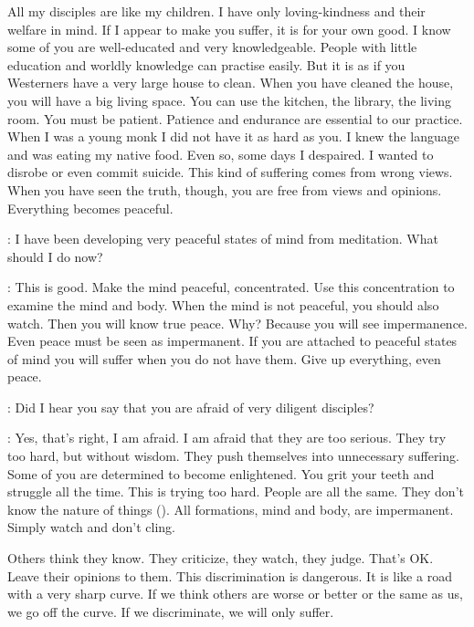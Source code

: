 All my disciples are like my children. I have only loving-kindness and their welfare in mind. If I appear to make you suffer, it is for your own good. I know some of you are well-educated and very knowledgeable. People with little education and worldly knowledge can practise easily. But it is as if you Westerners have a very large house to clean. When you have cleaned the house, you will have a big living space. You can use the kitchen, the library, the living room. You must be patient. Patience and endurance are essential to our practice. When I was a young monk I did not have it as hard as you. I knew the language and was eating my native food. Even so, some days I despaired. I wanted to disrobe or even commit suicide. This kind of suffering comes from wrong views. When you have seen the truth, though, you are free from views and opinions. Everything becomes peaceful. 

:
I have been developing very peaceful states of mind from meditation. What should I do now? 

: This is good. Make the mind peaceful, concentrated. Use this concentration to examine the mind and body. When the mind is not peaceful, you should also watch. Then you will know true peace. Why? Because you will see impermanence. Even peace must be seen as impermanent. If you are attached to peaceful states of mind you will suffer when you do not have them. Give up everything, even peace. 

:
Did I hear you say that you are afraid of very diligent disciples? 

: Yes, that's right, I am afraid. I am afraid that they are too serious. They try too hard, but without wisdom. They push themselves into unnecessary suffering. Some of you are determined to become enlightened. You grit your teeth and struggle all the time. This is trying too hard. People are all the same. They don't know the nature of things (). All formations, mind and body, are impermanent. Simply watch and don't cling. 

Others think they know. They criticize, they watch, they judge. That's OK. Leave their opinions to them. This discrimination is dangerous. It is like a road with a very sharp curve. If we think others are worse or better or the same as us, we go off the curve. If we discriminate, we will only suffer. 

